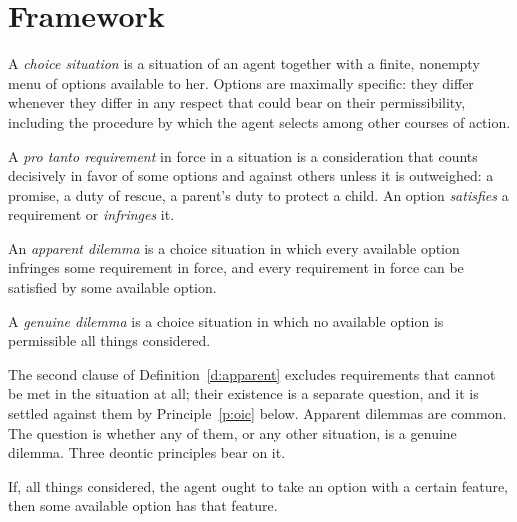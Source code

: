 \documentclass{situationist-preprint}
\begin{document}
\section{Framework}\label{s:framework}

\begin{definition}\label{d:situation}
A \emph{choice situation} is a situation of an agent together with a finite, nonempty menu of options available to her. Options are maximally specific: they differ whenever they differ in any respect that could bear on their permissibility, including the procedure by which the agent selects among other courses of action.
\end{definition}

\begin{definition}[Requirement]\label{d:requirement}
A \emph{pro tanto requirement} in force in a situation is a consideration that counts decisively in favor of some options and against others unless it is outweighed: a promise, a duty of rescue, a parent's duty to protect a child. An option \emph{satisfies} a requirement or \emph{infringes} it.
\end{definition}

\begin{definition}\label{d:apparent}
An \emph{apparent dilemma} is a choice situation in which every available option infringes some requirement in force, and every requirement in force can be satisfied by some available option.
\end{definition}

\begin{definition}\label{d:genuine}
A \emph{genuine dilemma} is a choice situation in which no available option is permissible all things considered.
\end{definition}

The second clause of Definition~\ref{d:apparent} excludes requirements that cannot be met in the situation at all; their existence is a separate question, and it is settled against them by Principle~\ref{p:oic} below. Apparent dilemmas are common. The question is whether any of them, or any other situation, is a genuine dilemma. Three deontic principles bear on it.

\begin{principle}\label{p:oic}
If, all things considered, the agent ought to take an option with a certain feature, then some available option has that feature.
\end{principle}
\end{document}
